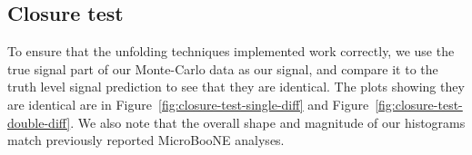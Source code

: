 \documentclass{article}
\newcommand{\vm}{\vec{p}_\mu}
\newcommand{\vlp}{\vec{p}_L}
\newcommand{\vrp}{\vec{p}_R}
\newcommand{\vtp}{\vec{p}_{\text{sum}}}
\def\VarList{
    MuonCosTheta/$\cos(\theta_{\vm})$,
    LeadingProtonCosTheta/$\cos(\theta_{\vlp})$,
    RecoilProtonCosTheta/$\cos(\theta_{\vrp})$,
    CosOpeningAngleProtons/$\cos(\theta_{\vlp,\vrp})$,
    CosOpeningAngleMuonTotalProton/$\cos(\theta_{\vm, \vtp})$,
    DeltaAlphaT/$\delta\alpha_T$,
    TransverseMomentum/$\delta P_T$,
    MuonMomentum/$|\vm|$,
    LeadingProtonMomentum/$|\vlp|$,
    RecoilProtonMomentum/$|\vrp|$,
    SerialTransverseMomentum_InMuonCosTheta/$\delta P_T$ in $\cos(\theta_{\vm})$,
    SerialDeltaAlphaT_InMuonCosTheta/$\delta \alpha_T$ in $\cos(\theta_{\vm})$,
    SerialCosOpeningAngleProtons_InMuonCosTheta/$\cos(\theta_{\vlp,\vrp})$ in $\cos(\theta_{\vm})$,
    SerialCosOpeningAngleMuonTotalProton_InMuonCosTheta/$\cos(\theta_{\vm, \vtp})$ in $\cos(\theta_{\vm})$
}
\newcommand{\PrintAllSmearing}{
    \foreach\VarName/\VarLabel in \VarList {
        \begin{figure}[H]
            \centering
                \texttt{[image: ./../Figs/CAFAna/Smear/\\VarName.png]}
            \caption{Additional smearing matrix for~\VarLabel.}
            \label{fig:smear-\VarName}
        \end{figure}
    }
}
\begin{document}

\subsection{Closure test}

To ensure that the unfolding techniques implemented work correctly, we use the true signal part of our Monte-Carlo data  
as our signal, and compare it to the truth level signal prediction to see that they are identical.
The plots showing they are identical are in Figure~\ref{fig:closure-test-single-diff} and Figure~\ref{fig:closure-test-double-diff}. 
We also note that the overall shape and magnitude of our histograms match previously reported MicroBooNE analyses. 

\begin{figure}
    \centering
     \\

\end{figure}
\end{document}
